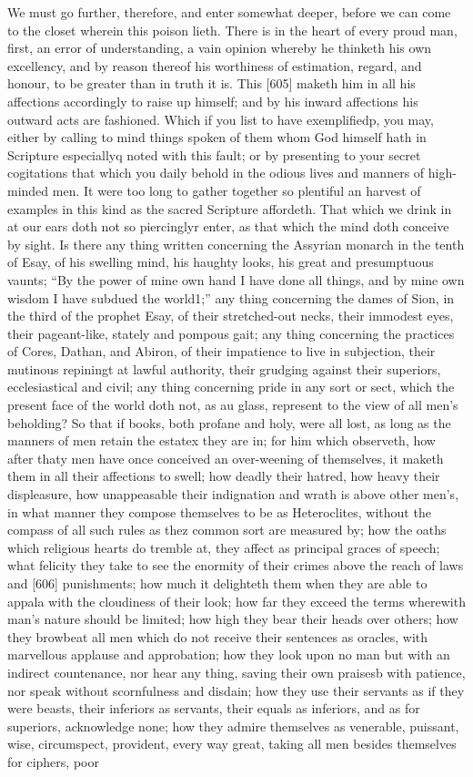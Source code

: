 We must go further, therefore, and enter somewhat deeper, before we can come to the closet wherein this poison lieth. There is in the heart of every proud man, first, an error of understanding, a vain opinion whereby he thinketh his own excellency, and by reason thereof his worthiness of estimation, regard, and honour, to be greater than in truth it is. This [605] maketh him in all his affections accordingly to raise up himself; and by his inward affections his outward acts are fashioned. Which if you list to have exemplifiedp, you may, either by calling to mind things spoken of them whom God himself hath in Scripture especiallyq noted with this fault; or by presenting to your secret cogitations that which you daily behold in the odious lives and manners of high-minded men. It were too long to gather together so plentiful an harvest of examples in this kind as the sacred Scripture affordeth. That which we drink in at our ears doth not so piercinglyr enter, as that which the mind doth conceive by sight. Is there any thing written concerning the Assyrian monarch in the tenth of Esay, of his swelling mind, his haughty looks, his great and presumptuous vaunts; “By the power of mine own hand I have done all things, and by mine own wisdom I have subdued the world1;” any thing concerning the dames of Sion, in the third of the prophet Esay, of their stretched-out necks, their immodest eyes, their pageant-like, stately and pompous gait; any thing concerning the practices of Cores, Dathan, and Abiron, of their impatience to live in subjection, their mutinous repiningt at lawful authority, their grudging against their superiors, ecclesiastical and civil; any thing concerning pride in any sort or sect, which the present face of the world doth not, as au glass, represent to the view of all men’s beholding? So that if books, both profane and holy, were all lost, as long as the manners of men retain the estatex they are in; for him which observeth, how after thaty men have once conceived an over-weening of themselves, it maketh them in all their affections to swell; how deadly their hatred, how heavy their displeasure, how unappeasable their indignation and wrath is above other men’s, in what manner they compose themselves to be as Heteroclites, without the compass of all such rules as thez common sort are measured by; how the oaths which religious hearts do tremble at, they affect as principal graces of speech; what felicity they take to see the enormity of their crimes above the reach of laws and [606] punishments; how much it delighteth them when they are able to appala with the cloudiness of their look; how far they exceed the terms wherewith man’s nature should be limited; how high they bear their heads over others; how they browbeat all men which do not receive their sentences as oracles, with marvellous applause and approbation; how they look upon no man but with an indirect countenance, nor hear any thing, saving their own praisesb with patience, nor speak without scornfulness and disdain; how they use their servants as if they were beasts, their inferiors as servants, their equals as inferiors, and as for superiors, acknowledge none; how they admire themselves as venerable, puissant, wise, circumspect, provident, every way great, taking all men besides themselves for ciphers, poor 